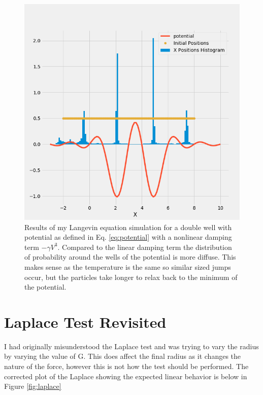 \documentclass[]{article}
\begin{document}
\begin{figure}
	\centering
	\includegraphics[width=.8\linewidth]{figures/lange_double_well_nonlinear.png}
	
	\caption{Results of my Langevin equation simulation for a double well with potential as defined in Eq. \ref{eq:potential} with a nonlinear damping term $-\gamma V^3$. Compared to the linear damping term the distribution of probability around the wells of the potential is more diffuse. This makes sense as the temperature is the same so similar sized jumps occur, but the particles take longer to relax back to the minimum of the potential. }
	\label{fig:lange_nonlinear}
	\end{figure}
	
\section{Laplace Test Revisited}
I had originally misunderstood the Laplace test and was trying to vary the radius by varying the value of G. This does affect the final radius as it changes the nature of the force, however this is not how the test should be performed. The corrected plot of the Laplace showing the expected linear behavior is below in Figure \ref{fig:laplace} 
\end{document}
